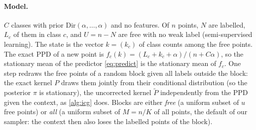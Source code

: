 \paragraph{Model.} $C$ classes with prior $\mathrm{Dir}(\alpha,\dots,\alpha)$ and no features. Of $n$ points,
$N$ are labelled, $L_c$ of them in class $c$, and $U=n-N$ are free with no weak label (semi-supervised learning). The
state is the vector $k=(k_c)$ of class counts among the free points. The exact PPD of a new point is
$f_c(k)=(L_c+k_c+\alpha)/(n+C\alpha)$, so the stationary mean of the predictor \eqref{eq:predict} is the stationary mean
of $f_c$. One step redraws the free points of a random block given all labels outside the block: the exact kernel $P$
draws them jointly from their conditional distribution (so the posterior $\pi$ is stationary), the uncorrected kernel
$\tilde P$ independently from the PPD given the context, as \cref{alg:icg} does. Blocks are either \emph{free} (a uniform
subset of $u$ free points) or \emph{all} (a uniform subset of $M=n/K$ of all points, the default of our sampler: the
context then also loses the labelled points of the block).


